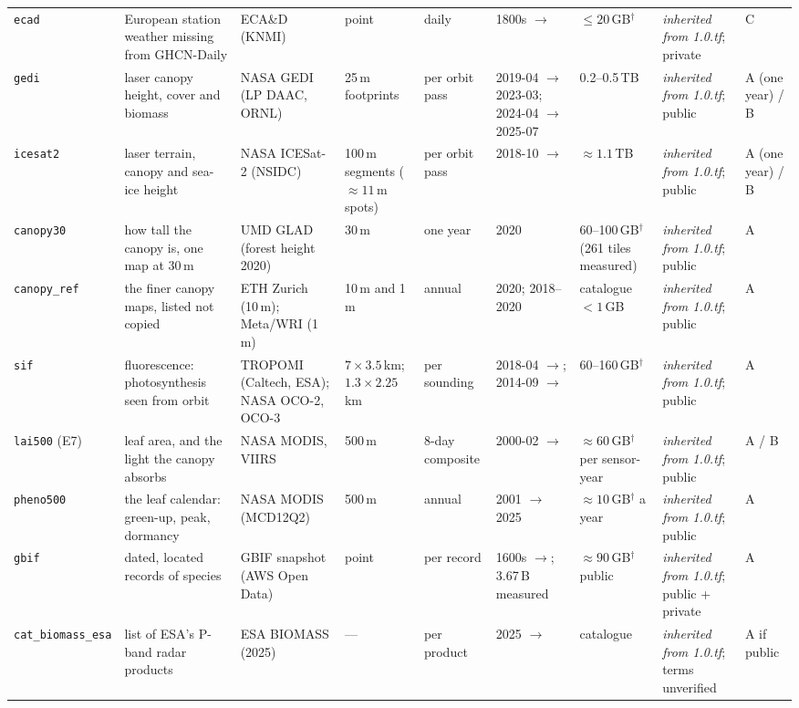 \documentclass[10pt]{article}
\newcommand{\code}[1]{\texttt{#1}}
\begin{document}
{\begin{longtable}{@{}L{1.65cm}L{2.6cm}L{2.0cm}L{1.7cm}L{1.75cm}L{1.85cm}L{2.5cm}L{2.1cm}L{0.5cm}@{}}
\code{ecad} & European station weather missing from GHCN-Daily & ECA\&D (KNMI) & point & daily & 1800s $\to$ & $\le 20$\,GB$^\dagger$ & \emph{inherited from 1.0.tf}; private & C \\
\code{gedi} & laser canopy height, cover and biomass & NASA GEDI (LP DAAC, ORNL) & 25\,m footprints & per orbit pass & 2019-04 $\to$ 2023-03; 2024-04 $\to$ 2025-07 & 0.2--0.5\,TB & \emph{inherited from 1.0.tf}; public & A (one year) / B \\
\code{icesat2} & laser terrain, canopy and sea-ice height & NASA ICESat-2 (NSIDC) & 100\,m segments ($\approx 11$\,m spots) & per orbit pass & 2018-10 $\to$ & $\approx 1.1$\,TB & \emph{inherited from 1.0.tf}; public & A (one year) / B \\
\code{canopy30} & how tall the canopy is, one map at 30\,m & UMD GLAD (forest height 2020) & 30\,m & one year & 2020 & 60--100\,GB$^\dagger$ (261 tiles measured) & \emph{inherited from 1.0.tf}; public & A \\
\code{canopy\_ref} & the finer canopy maps, listed not copied & ETH Zurich (10\,m); Meta/WRI (1\,m) & 10\,m and 1\,m & annual & 2020; 2018--2020 & catalogue $<1$\,GB & \emph{inherited from 1.0.tf}; public & A \\
\code{sif} & fluorescence: photosynthesis seen from orbit & TROPOMI (Caltech, ESA); NASA OCO-2, OCO-3 & $7\times3.5$\,km; $1.3\times2.25$\,km & per sounding & 2018-04 $\to$; 2014-09 $\to$ & 60--160\,GB$^\dagger$ & \emph{inherited from 1.0.tf}; public & A \\
\code{lai500} (E7) & leaf area, and the light the canopy absorbs & NASA MODIS, VIIRS & 500\,m & 8-day composite & 2000-02 $\to$ & $\approx 60$\,GB$^\dagger$ per sensor-year & \emph{inherited from 1.0.tf}; public & A / B \\
\code{pheno500} & the leaf calendar: green-up, peak, dormancy & NASA MODIS (MCD12Q2) & 500\,m & annual & 2001 $\to$ 2025 & $\approx 10$\,GB$^\dagger$ a year & \emph{inherited from 1.0.tf}; public & A \\
\code{gbif} & dated, located records of species & GBIF snapshot (AWS Open Data) & point & per record & 1600s $\to$; 3.67\,B measured & $\approx 90$\,GB$^\dagger$ public & \emph{inherited from 1.0.tf}; public + private & A \\
\code{cat\_\allowbreak biomass\_\allowbreak esa} & list of ESA's P-band radar products & ESA BIOMASS (2025) & --- & per product & 2025 $\to$ & catalogue & \emph{inherited from 1.0.tf}; terms unverified & A if public \\

\end{longtable}}
\end{document}
